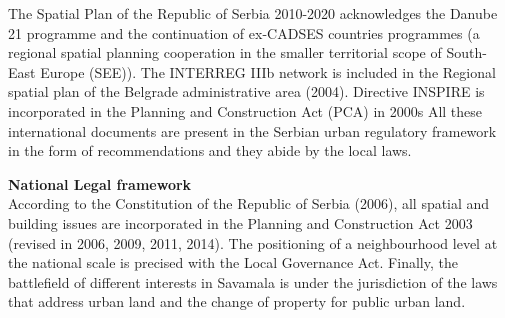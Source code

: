 \documentclass[11pt]{report}
\begin{document}
The Spatial Plan of the Republic of Serbia 2010-2020 acknowledges the Danube 21 programme and the continuation of ex-CADSES countries programmes (a regional spatial planning cooperation in the smaller territorial scope of South-East Europe (SEE)). The INTERREG IIIb network is included in the Regional spatial plan of the Belgrade administrative area (2004). Directive INSPIRE is incorporated in the Planning and Construction Act (PCA) in 2000s All these international documents are present in the Serbian urban regulatory framework in the form of recommendations and they abide by the local laws. 

\textbf{National Legal framework}
\\
According to the Constitution of the Republic of Serbia (2006), all spatial and building issues are incorporated in the Planning and Construction Act 2003 (revised in 2006, 2009, 2011, 2014). The positioning of a neighbourhood level at the national scale is precised with the Local Governance Act.
Finally, the battlefield of different interests in Savamala is under the jurisdiction of the laws that address urban land and the change of property for public urban land.
\end{document}
